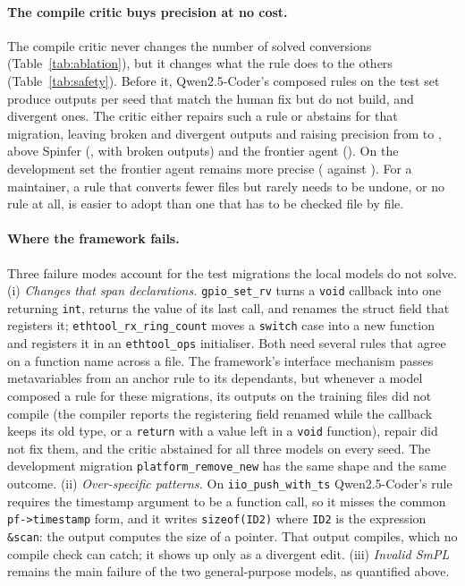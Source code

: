 \paragraph{The compile critic buys precision at no cost.} The compile critic never changes the number of
solved conversions (Table~\ref{tab:ablation}), but it changes what the rule does to the others
(Table~\ref{tab:safety}). Before it, Qwen2.5-Coder's composed rules on the test set produce
\testSafeQwenCoderPreBroken{} outputs per seed that match the human fix but do not build, and
\testSafeQwenCoderPreDivergent{} divergent ones. The critic either repairs such a rule or abstains for that
migration, leaving \testSafeQwenCoderBroken{} broken and \testSafeQwenCoderDivergent{} divergent outputs and raising
precision from \testSafeQwenCoderPrePrecision{} to \testSafeQwenCoderPrecision{}, above Spinfer
(\testSafeSpinferPrecision, with \testSafeSpinferBroken{} broken outputs) and the frontier agent
(\testSafeFrontierPrecision). On the development set the frontier agent remains more precise
(\devSafeFrontierPrecision{} against \devSafeQwenCoderPrecision). For a maintainer, a rule that converts fewer
files but rarely needs to be undone, or no rule at all, is easier to adopt than one that has to be checked file by
file.

\paragraph{Where the framework fails.} Three failure modes account for the test migrations the local models do not
solve. (i) \emph{Changes that span declarations.} \texttt{gpio\_set\_rv} turns a \texttt{void} callback into one
returning \texttt{int}, returns the value of its last call, and renames the struct field that registers it;
\texttt{ethtool\_rx\_ring\_count} moves a \texttt{switch} case into a new function and registers it in an
\texttt{ethtool\_ops} initialiser. Both need several rules that agree on a function name across a file. The
framework's interface mechanism passes metavariables from an anchor rule to its dependants, but whenever a model
composed a rule for these migrations, its outputs on the training files did not compile (the compiler reports
the registering field renamed while the callback keeps its old type, or a \texttt{return} with a value left in a
\texttt{void} function), repair did not fix them, and the critic abstained
for all three models on every seed. The development
migration \texttt{platform\_remove\_new} has the same shape and the same outcome. (ii) \emph{Over-specific
patterns.} On \texttt{iio\_push\_with\_ts} Qwen2.5-Coder's rule requires the timestamp argument to be a function
call, so it misses the common \texttt{pf->timestamp} form, and it writes \texttt{sizeof(ID2)} where
\texttt{ID2} is the expression \texttt{\&scan}: the output computes the size of a pointer. That output compiles,
which no compile check can catch; it shows up only as a divergent edit. (iii) \emph{Invalid SmPL} remains the main
failure of the two general-purpose models, as quantified above.


